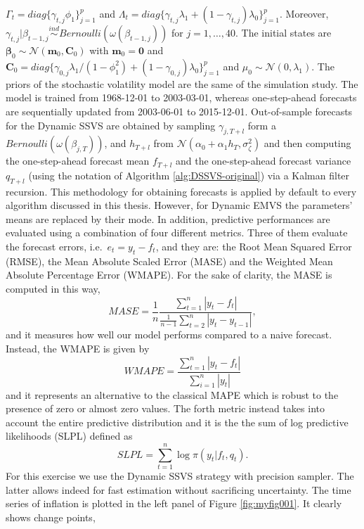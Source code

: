 \documentclass[
  12pt,
]{book}
\theoremstyle{break}
\theoremstyle{nonumberplain}
\begin{document}
\(\Gamma_t=diag\{\gamma_{t,j}\phi_{1}\}_{j=1}^{p}\) and
\(\Lambda_{t}=diag\{\gamma_{t,j}\lambda_{1}+(1-\gamma_{t,j})\lambda_{0}\}_{j=1}^{p}\).
Moreover,
\(\gamma_{t,j}|\beta_{t-1,j}\overset{ind}{\sim}Bernoulli(\omega(\beta_{t-1,j}))\)
for \(j=1,\ldots,40\). The initial states are
\(\boldsymbol{\beta}_{0}\sim\mathcal{N}(\boldsymbol{m}_{0},\boldsymbol{C}_{0})\)
with \(\boldsymbol{m}_{0}=\boldsymbol{0}\) and
\(\boldsymbol{C}_{0}=diag\{\gamma_{0,j}\lambda_{1}/(1-\phi_{1}^{2})+(1-\gamma_{0,j})\lambda_{0}\}_{j=1}^{p}\)
and \(\mu_0\sim\mathcal{N}(0,\lambda_1)\). The priors of the stochastic
volatility model are the same of the simulation study. The model is
trained from 1968-12-01 to 2003-03-01, whereas one-step-ahead forecasts
are sequentially updated from 2003-06-01 to 2015-12-01. Out-of-sample
forecasts for the Dynamic SSVS are obtained by sampling
\(\gamma_{j,T+l}\) form a \(Bernoulli(\omega(\beta_{j,T}))\), and
\(h_{T+l}\) from
\(\mathcal{N}(\alpha_0+\alpha_1 h_{T},\sigma^{2}_{\zeta})\) and then
computing the one-step-ahead forecast mean \(f_{T+l}\) and the
one-step-ahead forecast variance \(q_{T+l}\) (using the notation of
Algorithm \ref{alg:DSSVS-original}) via a Kalman filter recursion. This
methodology for obtaining forecasts is applied by default to every
algorithm discussed in this thesis. However, for Dynamic EMVS the
parameters' means are replaced by their mode. In addition, predictive
performances are evaluated using a combination of four different
metrics. Three of them evaluate the forecast errors,
i.e.~\(e_{t}=y_{t}-f_{t}\), and they are: the Root Mean Squared Error
(RMSE), the Mean Absolute Scaled Error (MASE) and the Weighted Mean
Absolute Percentage Error (WMAPE). For the sake of clarity, the MASE is
computed in this way, \[
MASE=\frac{1}{n}\frac{\sum_{t=1}^{n}|y_{t}-f_{t}|}{\frac{1}{n-1}\sum_{t=2}^{n}|y_{t}-{y}_{t-1}|},
\] and it measures how well our model performs compared to a naive
forecast. Instead, the WMAPE is given by \[
WMAPE=\frac{\sum_{t=1}^{n}|y_{t}-f_{t}|}{\sum_{i=1}^{n}|y_{t}|}
\] and it represents an alternative to the classical MAPE which is
robust to the presence of zero or almost zero values. The forth metric
instead takes into account the entire predictive distribution and it is
the the sum of log predictive likelihoods (SLPL) defined as \[
SLPL = \sum_{t=1}^{n}\log \pi(y_{t}|f_{t},q_{t}).
\] For this exercise we use the Dynamic SSVS strategy with precision
sampler. The latter allows indeed for fast estimation without
sacrificing uncertainty. The time series of inflation is plotted in the
left panel of Figure \ref{fig:myfig001}. It clearly shows change points,
\end{document}
